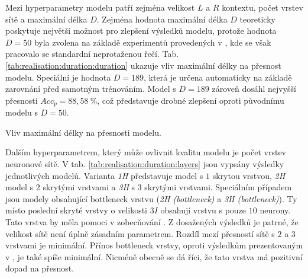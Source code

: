 Mezi hyperparametry modelu patří zejména velikost $L$ a $R$ kontextu, počet vrstev sítě a maximální délka $D$. Zejména hodnota maximální délka $D$ teoreticky poskytuje největší možnost pro zlepšení výsledků modelu, protože hodnota $D=50$ byla zvolena na základě experimentů provedených v \cite{Hadian2017}, kde se však pracovalo se standardní neprotaženou řečí. Tab. \ref{tab:realisation:duration:duration} ukazuje vliv maximální délky na přesnost modelu. Speciální je hodnota $D=189$, která je určena automaticky na základě zarovnání před samotným trénováním. Model s $D=189$ zároveň dosáhl nejvyšší přesnosti $Acc_{p} = 88,58\ \%$, což představuje drobné zlepšení oproti původnímu modelu s $D = 50$.

\begin{table}[htpb]
  \centering
  \def\arraystretch{1.5}
  \caption{Vliv maximální délky na přesnosti modelu.}
  \label{tab:realisation:duration:duration}
\end{table}

Dalším hyperparametrem, který může ovlivnit kvalitu modelu je počet vrstev neuronové sítě. V tab. \ref{tab:realisation:duration:layers} jsou vypsány výsledky jednotlivých modelů. Varianta \textit{1H} představuje model s $1$ skrytou vrstvou, \textit{2H} model s $2$ skrytými vrstvami a \textit{3H} s $3$ skrytými vrstvami. Speciálním případem jsou modely obsahující bottleneck vrstvu (\textit{2H (bottleneck)} a \textit{3H (bottleneck)}). Ty místo poslední skryté vrstvy o velikosti $3I$ obsahují vrstvu s pouze $10$ neurony. Tato vrstva by měla pomoci v zobecňování \cite{Hadian2017}. Z dosažených výsledků je patrné, že velikost sítě není úplně zásadním parametrem. Rozdíl mezí přesností sítě s $2$ a $3$ vrstvami je minimální. Přínos bottleneck vrstvy, oproti výsledkům prezentovaným v \cite{Hadian2017}, je také spíše minimální. Nicméně obecně se dá říci, že tato vrstva má pozitivní dopad na přesnost.

